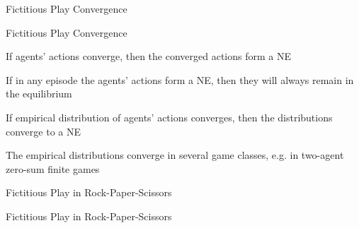 
\begin{frame}{Fictitious Play Convergence}
    \begin{graytitlebox}{Fictitious Play Convergence}
        \blist
            \itemsep=10pt
            \item<1-> If agents' actions converge, then the converged actions form a NE
            \item<2-> If in any episode the agents' actions form a NE, then they will always remain in the equilibrium
            \item<3-> If empirical distribution of agents' actions converges, then the distributions converge to a NE
            \item<4-> The empirical distributions converge in several game classes, e.g. in two-agent zero-sum finite games
        \elist
    \end{graytitlebox}
\end{frame}

\begin{frame}[t]{Fictitious Play in Rock-Paper-Scissors}
    \centering
\end{frame}

\begin{frame}{Fictitious Play in Rock-Paper-Scissors}
    \centering
\end{frame}
 
